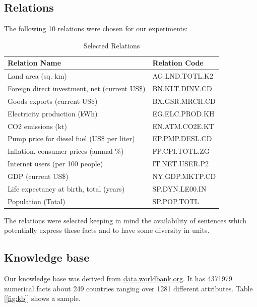 \documentclass[a4paper,10pt]{article}
\begin{document}
\subsection{Relations}
The following 10 relations were chosen for our experiments:
 \begin{center}
 \begin{table}[H]
\begin{tabular}{|l|l|}
\hline
Relation Name & Relation Code \\
\hline
Land area (sq. km)&AG.LND.TOTL.K2\\
Foreign direct investment, net (current US\$)&BN.KLT.DINV.CD\\
Goods exports (current US\$)&BX.GSR.MRCH.CD\\
Electricity production (kWh)&EG.ELC.PROD.KH\\
CO2 emissions (kt)&EN.ATM.CO2E.KT\\
Pump price for diesel fuel (US\$ per liter)&EP.PMP.DESL.CD\\
Inflation, consumer prices (annual \%)&FP.CPI.TOTL.ZG\\
Internet users (per 100 people)&IT.NET.USER.P2\\
GDP (current US\$)&NY.GDP.MKTP.CD\\
Life expectancy at birth, total (years)&SP.DYN.LE00.IN\\
Population (Total)&SP.POP.TOTL\\
\hline
\end{tabular}
\caption{Selected Relations}
\label{rels}
\end{table}
\end{center}

The relations were selected keeping in mind the availability of sentences which potentially express these facts
and to have some diversity in units.

\subsection{Knowledge base}
Our knowledge base was derived from \url{data.worldbank.org}.
It has 4371979 numerical facts about 249 countries ranging over 1281 different attributes. 
Table [\ref{fig:kb}] shows a sample.
\end{document}
